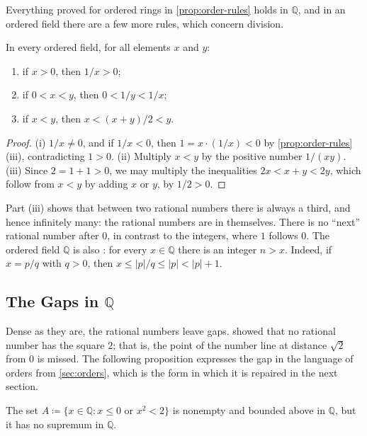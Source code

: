 Everything proved for ordered rings in \cref{prop:order-rules} holds in $\mathbb Q$, and in an ordered field there are a few more rules, which concern division.

\begin{proposition}
\label{prop:field-order}
In every ordered field, for all elements $x$ and $y$:
\begin{enumerate}
\item if $x>0$, then $1/x>0$;
\item if $0<x<y$, then $0<1/y<1/x$;
\item if $x<y$, then $x<(x+y)/2<y$.
\end{enumerate}
\end{proposition}

\begin{proof}
(i) $1/x\ne0$, and if $1/x<0$, then $1=x\cdot(1/x)<0$ by \cref{prop:order-rules}\,(iii), contradicting $1>0$. (ii) Multiply $x<y$ by the positive number $1/(xy)$. (iii) Since $2=1+1>0$, we may multiply the inequalities $2x<x+y<2y$, which follow from $x<y$ by adding $x$ or $y$, by $1/2>0$.
\end{proof}

Part (iii) shows that between two rational numbers there is always a third, and hence infinitely many: the rational numbers are  in themselves. There is no ``next'' rational number after $0$, in contrast to the integers, where $1$ follows $0$. The ordered field $\mathbb Q$ is also : for every $x\in\mathbb Q$ there is an integer $n>x$. Indeed, if $x=p/q$ with $q>0$, then $x\le|p|/q\le|p|<|p|+1$.

\subsection{The Gaps in $\mathbb Q$}

Dense as they are, the rational numbers leave gaps.  showed that no rational number has the square $2$; that is, the point of the number line at distance $\sqrt2$ from $0$ is missed. The following proposition expresses the gap in the language of orders from \cref{sec:orders}, which is the form in which it is repaired in the next section.

\begin{proposition}
\label{prop:q-gap}
The set $A\coloneqq\{x\in\mathbb Q: x\le0\text{ or }x^2<2\}$ is nonempty and bounded above in $\mathbb Q$, but it has no supremum in $\mathbb Q$.
\end{proposition}

